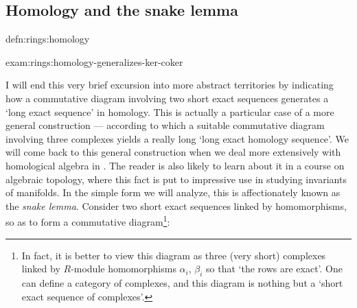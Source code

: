 \subsection{Homology and the snake lemma}
\label{subsec:rings:homology-and-the-snake-lemma}

\begin{defn}{}{defn:rings:homology}
\end{defn}

\begin{exam}{}{exam:rings:homology-generalizes-ker-coker}
\end{exam}
I will end this very brief excursion into more abstract territories by
indicating how a commutative diagram involving two short exact
sequences generates a `long exact sequence' in homology. This is
actually a particular case of a more general construction ---
according to which a suitable commutative diagram involving three
complexes yields a really long `long exact homology sequence'. We will
come back to this general construction when we deal more extensively
with homological algebra in . The reader is also
likely to learn about it in a course on algebraic topology, where this
fact is put to impressive use in studying invariants of manifolds.  In
the simple form we will analyze, this is affectionately known as the
\emph{snake lemma}. Consider two short exact sequences linked by
homomorphisms, so as to form a commutative diagram\footnote{In fact,
  it is better to view this diagram as three (very short) complexes
  linked by $R$-module homomorphisms $\alpha_i$, $\beta_i$ so that
  `the rows are exact'. One can define a category of complexes, and
  this diagram is nothing but a `short exact sequence of complexes'.}:
